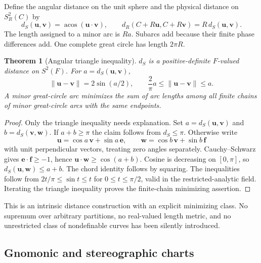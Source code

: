 \documentclass[11pt,letterpaper]{article}
\numberwithin{equation}{section}
\newtheorem{theorem}{Theorem}[section]
\theoremstyle{definition}
\theoremstyle{remark}
\newcommand{\acos}{\operatorname{acos}}
\newcommand{\norm}[1]{\left\lVert#1\right\rVert}
\newcommand{\vv}[1]{\bm{#1}}
\begin{document}
Define the angular distance on the unit sphere and the physical distance on
$S_R^2(C)$ by
\begin{equation}\label{e3:eq:angulardistance}
 d_S(\vv u,\vv v)=\acos(\vv u\cdot\vv v),\qquad
 d_R(C+R\vv u,C+R\vv v)=R\,d_S(\vv u,\vv v).
\end{equation}
The length assigned to a minor arc is $Ra$. Subarcs add because their finite
phase differences add. One complete great circle has length $2\pi R$.

\begin{theorem}[Angular triangle inequality]\label{e3:thm:angularmetric}
$d_S$ is a positive-definite $F$-valued distance on $S^2(F)$. For
$a=d_S(\vv u,\vv v)$,
\begin{equation}\label{e3:eq:chordangle}
 \norm{\vv u-\vv v}=2\sin(a/2),\qquad
 \frac{2}{\pi}a\le\norm{\vv u-\vv v}\le a.
\end{equation}
A minor great-circle arc minimizes the sum of arc lengths among all finite
chains of minor great-circle arcs with the same endpoints.
\end{theorem}
\begin{proof}
Only the triangle inequality needs explanation. Set
$a=d_S(\vv u,\vv v)$ and $b=d_S(\vv v,\vv w)$. If $a+b\ge\pi$ the
claim follows from $d_S\le\pi$. Otherwise write
\[
 \vv u=\cos a\,\vv v+\sin a\,\vv e,\qquad
 \vv w=\cos b\,\vv v+\sin b\,\vv f
\]
with unit perpendicular vectors, treating zero angles separately.
Cauchy--Schwarz gives $\vv e\cdot\vv f\ge-1$, hence
$\vv u\cdot\vv w\ge\cos(a+b)$. Cosine is decreasing on $[0,\pi]$, so
$d_S(\vv u,\vv w)\le a+b$. The chord identity follows by squaring.
The inequalities follow from $2t/\pi\le\sin t\le t$ for
$0\le t\le\pi/2$, valid in the restricted-analytic field. Iterating the
triangle inequality proves the finite-chain minimizing assertion.
\end{proof}

This is an intrinsic distance construction with an explicit minimizing class.
No supremum over arbitrary partitions, no real-valued length metric, and no
unrestricted class of nondefinable curves has been silently introduced.

\subsection{Gnomonic and stereographic charts}\label{e3:subsec:charts}
\end{document}
